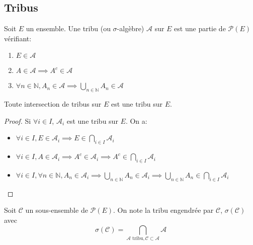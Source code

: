 \subsection{Tribus}


\begin{definition}[Tribu]
	Soit $E$ un ensemble. Une tribu (ou $\sigma$-algèbre) $\mathscr{A}$ sur $E$ est une partie de $\mathscr{P}(E)$ vérifiant:
	\begin{enumerate}
		\item $E \in \mathscr{A}$
		\item $A \in \mathscr{A} \implies A^c \in \mathscr{A}$
		\item $ \forall n \in \mathbb{N}, A_n \in \mathscr{A} \implies \bigcup\limits_{n \in \mathbb{N}} A_n \in \mathscr{A}$
	\end{enumerate}
\end{definition}


\begin{prop}
	Toute intersection de tribus sur $E$ est une tribu sur $E$.
\end{prop}

\begin{proof}\label{proof:intersection_tribus}
	Si $\forall i \in I$, $\mathscr{A}_i$ est une tribu sur $E$. On a:
	\begin{itemize}
		\item $\forall  i \in I, E \in \mathscr{A}_i \implies E \in \bigcap\limits_{i \in I} \mathscr{A}_i$
		\item $\forall i \in I, A \in \mathscr{A}_i \implies  A^c \in \mathscr{A}_i
			      \implies A^c \in \bigcap\limits_{i \in I} \mathscr{A}_i$
		\item $\forall i \in I, \forall n \in \mathbb{N}, A_n \in \mathscr{A}_i \implies
			      \bigcup\limits_{n \in \mathbb{N}} A_n \in \mathscr{A}_i \implies
			      \bigcup\limits_{n \in \mathbb{N}} A_n \in \bigcap\limits_{i \in I} \mathscr{A}_i$
	\end{itemize}
\end{proof}

\begin{definition}
	Soit $\mathscr{C}$ un sous-ensemble de $\mathscr{P}(E)$. On note la tribu
	engendrée par $\mathscr{C}$, $\sigma(\mathscr{C})$ avec
	\begin{equation*}
		\sigma(\mathscr{C}) = \bigcap\limits_{\mathscr{A} \text{ tribu}, \mathscr{C} \subset \mathscr{A}} \mathscr{A}
	\end{equation*}
\end{definition}

